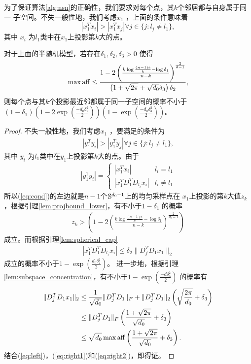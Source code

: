 \documentclass[main]{subfiles}
\begin{document}
为了保证算法\ref{alg:nsn}的正确性，我们要求对每个点，其$k$个邻居都与自身属于同一
子空间。不失一般性地，我们考虑$x_1$ ，上面的条件意味着
$$ |x_1^T x_i|>|x_1^T x_j| \forall j \in \{j:l_j \ne l_1\}, $$
其中 $x_i$ 为$l_1$类中在$x_1$上投影第$k$大的点。
\begin{theorem} \label{thm:nsn}
  对于上面的半随机模型，若存在$\delta_1, \delta_2, \delta_3 >0$ 使得
  $$\max \aff \le \frac{1-2\left( \frac{k\log \frac{(n-1)e}{k}-\log \delta_1}
  {n-k} \right)^{\frac{2}{d-1}}}{\left( 1+\sqrt{2\pi}+\sqrt{d_0}\delta_3\right)\delta_2}, $$
  则每个点与其$k$个投影最近邻都属于同一子空间的概率不小于$(1-\delta_1)(1-2\exp(\frac{-d_0
  \delta_2^2}{2}))(1-\exp(\frac{-d_0 \delta_3^2}{2}))$。
\end{theorem}
\begin{proof}
不失一般性地，我们考虑$x_1$ ，要满足的条件为
\begin{align}
  |y_1^T y_i|>|y_1^T y_j| \forall j \in \{j:l_j \ne l_1\},
  \label{eq:cond}
\end{align}
其中 $y_i$ 为$l_1$类中在$y_1$上投影第$k$大的点。由于
\begin{align*}
  |y_1^1 y_i|=
  \begin{cases}
    |x_1^T x_i| & l_i = l_1 \\
    |x_1^T D_1^T D_{l_i}x_i| & l_i \ne l_1
  \end{cases}
\end{align*}
所以(\ref{eq:cond})的左边就是$n-1$个$\S^{d_0-1}$上的均匀采样点在
$x_1$上投影的第$k$大值$z_k$，根据引理\ref{lem:projbound_lower}，有不小于$1-\delta_1$
的概率
\begin{align}
  z_k>\left( 1-2\left(\frac{k\log \frac{(n-1)e}{k}-\log \delta_1}{n-k}
    \right)^{\frac{2}{d_0-1}}\right)
  \label{eq:left}
\end{align}
成立。而根据引理\ref{lem:spherical_cap}
\begin{align} \label{eq:right1}
  |x_1^T D_1^T D_{l_i}x_i| \le \delta_2 \|D_j^T D_1 x_1\|_2
\end{align}
成立的概率不小于$1-\exp(\frac{d_0 \delta_2^2}{2})$。
进一步地，根据引理\ref{lem:subspace_concentration}，有不小于$1-\exp(\frac{-d\delta_3^2}{2})$
的概率有
\begin{align}
  \|D_j^T D_1 x_1\|_2 &\le \frac{1}{\sqrt{d_0}} \|D_j^TD_1\|_F +
  \|D_j^T D_1\|_2 \left( \sqrt{\frac{2\pi}{d_0}}+\delta_3 \right) \nonumber\\
  &\le \|D_j^TD_1\|_F \left(\frac{1+\sqrt{2\pi}}{\sqrt{d_0}}+\delta_3
  \right) \nonumber \\
  &\le \sqrt{d_0} \max \aff \left(\frac{1+\sqrt{2\pi}}{\sqrt{d_0}}+\delta_3
  \right).
  \label{eq:right2}
\end{align}
结合(\ref{eq:left})，(\ref{eq:right1})和(\ref{eq:right2})，即得证。

\end{proof}
\end{document}
